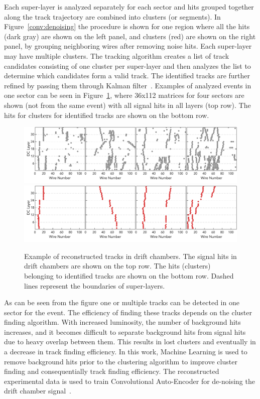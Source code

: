 Each super-layer is analyzed separately for each sector and hits grouped together along the track trajectory 
are combined into clusters (or segments). In Figure~\ref{conv:denoising} the procedure is shown for one
region where all the hits (dark gray) are shown on the left panel, and clusters (red) are shown on the right panel,
by grouping neighboring wires after removing noise hits. Each super-layer
may have multiple clusters. The tracking algorithm creates a list of track candidates consisting of one cluster 
per super-layer and then analyzes the list to determine which candidates form a valid track. The identified 
tracks are further refined by passing them through Kalman filter~\cite{Kalman1960}. 
Examples of analyzed events in one sector can be seen in Figure~\ref{conv:trackfinding}, where 36x112 matrices
for four sectors are shown (not from the same event) with all signal hits in all layers (top row). The hits 
for clusters for identified tracks are shown on the bottom row. 


 \begin{figure}[!h]
\begin{center}
 \includegraphics[width=6.0in]{images/dc_example_all_hits.pdf}
 \includegraphics[width=6.0in]{images/dc_example_track_hits.pdf}
\caption {Example of reconstructed tracks in drift chambers. The signal hits in drift chambers are shown 
on the top row. The hits (clusters) belonging to identified tracks are shown on the bottom row. Dashed 
lines represent the boundaries of super-layers.}
 \label{conv:trackfinding}
 \end{center}
\end{figure}

As can be seen from the figure one or multiple tracks can be detected in one sector for the event. The efficiency
of finding these tracks depends on the cluster finding algorithm. With increased luminosity, the number of background 
hits increases, and it becomes difficult to separate background hits from signal hits due to heavy overlap between them.
This results in lost clusters and eventually in a decrease in track finding efficiency. 
In this work, Machine Learning is used to remove background hits prior to the clustering algorithm to improve cluster 
finding and consequentially track finding efficiency. The reconstructed experimental data is used to train Convolutional
Auto-Encoder for de-noising the drift chamber signal~\cite{Thomadakis:2022zcd}.

